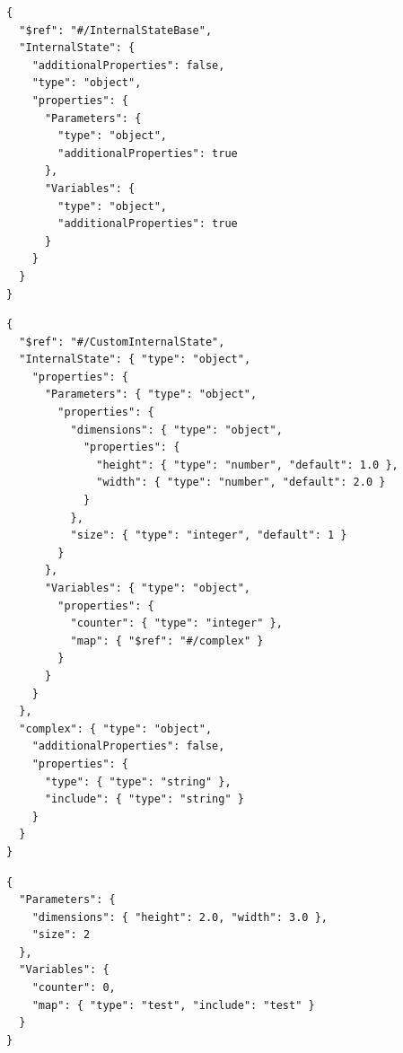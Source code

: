 \begin{lstlisting}[float,frame=tb,caption={Base schema of the internal state defined using JSON schema},label=lst:json-is-base]
{
  "$ref": "#/InternalStateBase",
  "InternalState": {
    "additionalProperties": false,
    "type": "object",
    "properties": {
      "Parameters": {
        "type": "object",
        "additionalProperties": true
      },
      "Variables": {
        "type": "object",
        "additionalProperties": true
      }
    }
  }
}
\end{lstlisting}

\begin{lstlisting}[float,frame=tb,caption={Internal state defined using JSON schema},label=lst:json-is]
{
  "$ref": "#/CustomInternalState",
  "InternalState": { "type": "object",
    "properties": {
      "Parameters": { "type": "object",
        "properties": {
          "dimensions": { "type": "object",
            "properties": {
              "height": { "type": "number", "default": 1.0 },
              "width": { "type": "number", "default": 2.0 }
            }
          },
          "size": { "type": "integer", "default": 1 }
        }
      },
      "Variables": { "type": "object",
        "properties": {
          "counter": { "type": "integer" },
          "map": { "$ref": "#/complex" }
        }
      }
    }
  },
  "complex": { "type": "object",
    "additionalProperties": false,
    "properties": {
      "type": { "type": "string" },
      "include": { "type": "string" }
    }
  }
}
\end{lstlisting}

\begin{lstlisting}[float,frame=tb,caption={Internal state instance defined in JSON},label=lst:json-inst]
{
  "Parameters": {
    "dimensions": { "height": 2.0, "width": 3.0 },
    "size": 2
  },
  "Variables": {
    "counter": 0,
    "map": { "type": "test", "include": "test" }
  }
}
\end{lstlisting}

